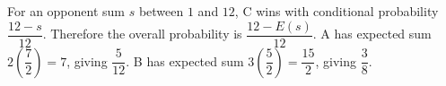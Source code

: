 For an opponent sum $s$ between $1$ and $12$, C wins with conditional probability $\dfrac{12-s}{12}$. Therefore the overall probability is $\dfrac{12-E(s)}{12}$. A has expected sum $2(\dfrac{7}{2})=7$, giving $\boxed{\dfrac{5}{12}}$. B has expected sum $3(\dfrac{5}{2})=\dfrac{15}{2}$, giving $\boxed{\dfrac{3}{8}}$.

